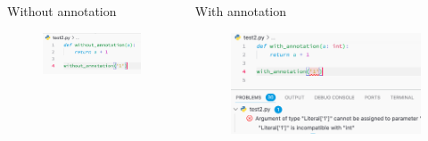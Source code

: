 \documentclass[beamer, en, version=2.0]{huangfusl-template}
\begin{document}
\begin{frame}
{        \begin{columns}
        \begin{column}{0.5\textwidth}
            \begin{block}{Without annotation}
                \begin{figure}[h]
                    \includegraphics[width=\textwidth]{imgs/without-annotation-2.png}
                \end{figure}
            \end{block}
        \end{column}
        \begin{column}{0.5\textwidth}
            \begin{block}{With annotation}
                \begin{figure}[h]
                    \includegraphics[width=\textwidth]{imgs/with-annotation-2.png}
                \end{figure}
            \end{block}
        \end{column}
        \end{columns}
        }

    \end{frame}
\end{document}
